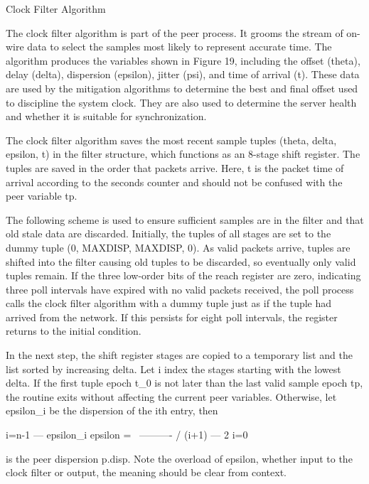  Clock Filter Algorithm

   The clock filter algorithm is part of the peer process.  It grooms
   the stream of on-wire data to select the samples most likely to
   represent accurate time.  The algorithm produces the variables shown
   in Figure 19, including the offset (theta), delay (delta), dispersion
   (epsilon), jitter (psi), and time of arrival (t).  These data are
   used by the mitigation algorithms to determine the best and final
   offset used to discipline the system clock.  They are also used to
   determine the server health and whether it is suitable for
   synchronization.

   The clock filter algorithm saves the most recent sample tuples
   (theta, delta, epsilon, t) in the filter structure, which functions
   as an 8-stage shift register.  The tuples are saved in the order that
   packets arrive.  Here, t is the packet time of arrival according to
   the seconds counter and should not be confused with the peer variable
   tp.

   The following scheme is used to ensure sufficient samples are in the
   filter and that old stale data are discarded.  Initially, the tuples
   of all stages are set to the dummy tuple (0, MAXDISP, MAXDISP, 0).
   As valid packets arrive, tuples are shifted into the filter causing
   old tuples to be discarded, so eventually only valid tuples remain.
     If the three low-order bits of the reach register are zero,
   indicating three poll intervals have expired with no valid packets
   received, the poll process calls the clock filter algorithm with a
   dummy tuple just as if the tuple had arrived from the network.  If
   this persists for eight poll intervals, the register returns to the
   initial condition.

   In the next step, the shift register stages are copied to a temporary
   list and the list sorted by increasing delta.  Let i index the stages
   starting with the lowest delta.  If the first tuple epoch t_0 is not
   later than the last valid sample epoch tp, the routine exits without
   affecting the current peer variables.  Otherwise, let epsilon_i be
   the dispersion of the ith entry, then

                     i=n-1
                     ---     epsilon_i
      epsilon =       \     ----------
                      /        (i+1)
                     ---     2
                     i=0

   is the peer dispersion p.disp.  Note the overload of epsilon, whether
   input to the clock filter or output, the meaning should be clear from
   context.

